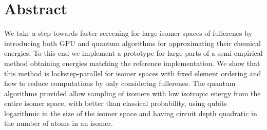 \chapter*{Abstract}
We take a step towards faster screening for large isomer spaces of fullerenes by introducing both GPU and quantum algorithms for approximating their chemical energies. To this end we implement a prototype for large parts of a semi-empirical method obtaining energies matching the reference implementation. We show that this method is lockstep-parallel for isomer spaces with fixed element ordering and how to reduce computations by only considering fullerenes. The quantum algorithms provided allow sampling of isomers with low isotropic energy from the entire isomer space, with better than classical probability, using qubits logarithmic in the size of the isomer space and having circuit depth quadratic in the number of atoms in an isomer. 
